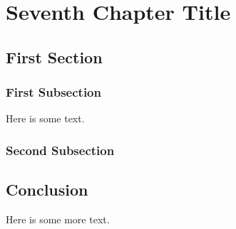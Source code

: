  \chapter{Seventh Chapter Title}


\section{First Section}
\subsection{First Subsection}
Here is some text. 

\subsection{Second Subsection}

\section{Conclusion}
Here is some more text. 